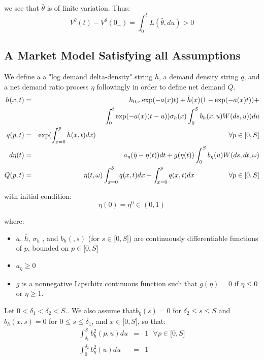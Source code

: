 \documentclass{article}
\begin{document}
we see that $\bar{\theta}$ is of finite variation. Thus:%
\begin{equation*}
V^{\bar{\theta}}(t)-V^{\bar{\theta}}(0_{-})=\int_{0}^{t}L(\bar{\theta},du)>0
\end{equation*}

\subsection{A Market Model Satisfying all Assumptions}

We define a a "log demand delta-density" string $h$, a demand density string 
$q$, and a net demand ratio process $\eta $ followingly in order to define
net demand $Q$.%
\begin{eqnarray}
h(x,t) &=&h_{0,x}\exp (-a(x)t)+\bar{h}(x)(1-\exp (-a(x)t))+  \label{equ_h_A}
\\
&&\int_{0}^{t}\exp (-a(x)(t-u))\sigma _{h}(x)\int_{0}^{S}b_{h}(x,u)W(ds,u))du
\notag \\
q(p,t) &=&\exp ({\int_{x=0}^{p}h(x,t)dx)}\text{ \ \ \ \ \ \ \ \ \ \ \ \ \ \
\ \ \ \ \ \ \ \ \ \ \ \ \ \ \ \ \ \ \ \ \ \ \ \ \ \ \ \ \ \ \ \ \ \ \ \ \ \
\ \ \ }\forall p\in \lbrack 0,S]  \label{equ_q_A} \\
d\eta (t) &=&a_{\eta }(\bar{\eta}-\eta (t))dt+g(\eta (t))\int_{0}^{S}b_{\eta
}(u)W(ds,dt,\omega )  \label{equ_eta_A_bis} \\
Q(p,t) &=&\eta (t,\omega )\int_{x=0}^{S}q(x,t)dx-\int_{x=0}^{p}q(x,t)dx\text{
\ \ \ \ \ \ \ \ \ \ \ \ }\forall p\in \lbrack 0,S]  \label{equ_Q_A}
\end{eqnarray}

with initial condition:%
\begin{equation}
\eta (0)=\eta ^{0}\in (0,1)
\end{equation}

where:

\begin{itemize}
\item $a$, $\bar{h}$, $\sigma _{h}$ , and $b_{h}(,s)$ (for $s\in \lbrack
0,S] $) are continuously differentiable functions of $p$, bounded on $p\in
\lbrack 0,S]$

\item $a_{\eta }\geq 0$

\item $g$ is a nonnegative Lipschitz continuous function such that $g(\eta
)=0$ if $\eta \leq 0$ or $\eta \geq 1$.
\end{itemize}

Let $0<\delta _{1}<\delta _{2}<S$.. We also assume that$b_{\eta }(s)=0$ for $%
\delta _{2}\leq s\leq S$ and $b_{h}(x,s)=0$ for $0\leq s\leq \delta _{1}$,
and $x\in \lbrack 0,S]$, so that:%
\begin{eqnarray}
\int_{\delta _{1}}^{S}b_{h}^{2}(p,u)du &=&1\text{\ \ \ \ \ \ \ }\forall p\in
\lbrack 0,S]  \label{bh} \\
\int_{0}^{\delta _{2}}b_{\eta }^{2}(u)du &=&1  \label{b_eta}
\end{eqnarray}
\end{document}
